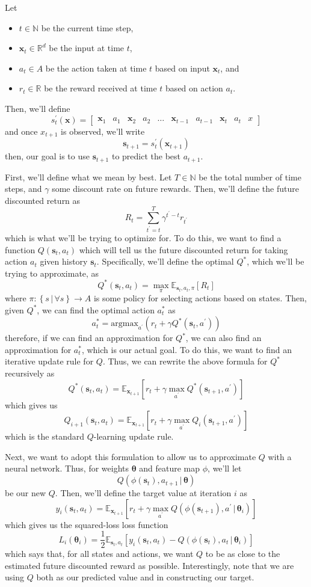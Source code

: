\documentclass[12pt,letterpaper]{hmcpset}
\newcommand{\m}[1]{\begin{bmatrix}#1\end{bmatrix}}
\newcommand{\tx}[1]{\text{#1}}
\newcommand{\pn}[1]{\left(#1\right)}
\newcommand{\bk}[1]{\left[#1\right]}
\newcommand{\set}[1]{\left\{#1\right\}}
\newcommand{\given}{\,|\,}
\newcommand{\bbm}[1]{\mathbb{#1}}
\begin{document}
Let
\begin{itemize}
\item $t \in \bbm N$ be the current time step,
\item $\bm x_t \in \bbm R^d$ be the input at time $t$,
\item $a_t \in A$ be the action taken at time $t$ based on input $\bm x_t$, and
\item $r_t \in \bbm R$ be the reward received at time $t$ based on action $a_t$.
\end{itemize}
Then, we'll define
\[
    s_t^\prime(\bm x) = \m{\bm x_1 & a_1 & \bm x_2 & a_2 & \ldots & \bm x_{t-1} & a_{t-1} & \bm x_t & a_t & x}
\]
and once $x_{t+1}$ is observed, we'll write
\[
    \bm s_{t+1} = s_t^\prime(\bm x_{t+1})
\]
then, our goal is to use $\bm s_{t+1}$ to predict the best $a_{t+1}$.

First, we'll define what we mean by best. Let $T \in \bbm N$ be the total number of time steps, and $\gamma$ some discount rate on future rewards. Then, we'll define the future discounted return as
\[
    R_t = \sum_{t^\prime = t}^T \gamma^{t^\prime - t} r_{t^\prime}
\]
which is what we'll be trying to optimize for. To do this, we want to find a function $Q(\bm s_t, a_t)$ which will tell us the future discounted return for taking action $a_t$ given history $\bm s_t$. Specifically, we'll define the optimal $Q^*$, which we'll be trying to approximate, as
\[
    Q^*(\bm s_t, a_t) = \max_\pi \bbm E_{\bm s_t, a_t, \pi} \bk{R_t}
\]
where $\pi: \set{s \given \forall s} \to A$ is some policy for selecting actions based on states. Then, given $Q^*$, we can find the optimal action $a_t^*$ as
\[
    a_t^* = \tx{argmax}_{a^\prime}\pn{r_t + \gamma Q^*(\bm s_t, a^\prime)}
\]
therefore, if we can find an approximation for $Q^*$, we can also find an approximation for $a_t^*$, which is our actual goal. To do this, we want to find an iterative update rule for $Q$. Thus, we can rewrite the above formula for $Q^*$ recursively as
\[
    Q^*(\bm s_t, a_t) = \bbm E_{\bm x_{t+1}} \bk{r_t + \gamma \max_{a^\prime} Q^*(\bm s_{t+1}, a^\prime)}
\]
which gives us
\[
    Q_{i+1}(\bm s_t, a_t) = \bbm E_{\bm x_{t+1}} \bk{r_t + \gamma \max_{a^\prime} Q_i(\bm s_{t+1}, a^\prime)}
\]
which is the standard $Q$-learning update rule.

Next, we want to adopt this formulation to allow us to approximate $Q$ with a neural network. Thus, for weights $\bm\theta$ and feature map $\phi$, we'll let
\[
    Q(\phi(\bm s_t), a_{t+1} \given \bm\theta)
\]
be our new $Q$. Then, we'll define the target value at iteration $i$ as
\[
    y_i(\bm s_t, a_t) = \bbm E_{\bm x_{t+1}} \bk{r_t + \gamma \max_{a^\prime} Q(\phi(\bm s_{t+1}), a^\prime \given \bm\theta_i)}
\]
which gives us the squared-loss loss function
\[
    L_i(\bm \theta_i) = \frac{1}{2} \bbm E_{\bm s_t, a_t} \bk{y_i(\bm s_t, a_t) - Q(\phi(\bm s_t), a_t \given \bm \theta_i)}
\]
which says that, for all states and actions, we want $Q$ to be as close to the estimated future discounted reward as possible. Interestingly, note that we are using $Q$ both as our predicted value and in constructing our target.
\end{document}
